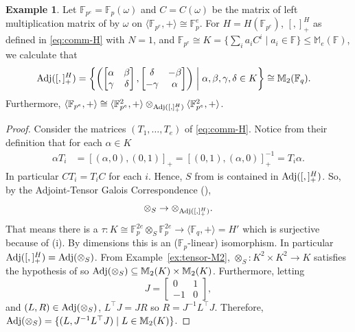 \documentclass{toc}
\numberwithin{equation}{section}
\theoremstyle{plain}       %
\theoremstyle{remark}
\theoremstyle{definition}
\newtheorem{ex}[equation]{Example}  %
\numberwithin{figure}{section}
\numberwithin{table}{section}
\renewcommand{\subset}{\subseteq}
\newcommand{\bbF}{\mathbb{F}}  %
\begin{document}
\begin{ex}\label{ex:Hei-Adj}
	Let $\bbF_{p^e}=\bbF_p(\omega)$ and $C=C(\omega)$ be the matrix of left
	multiplication matrix of by $\omega$ on $\langle \bbF_{p^e},+\rangle\cong
	\bbF_p^e$. For $H=H(\bbF_{p^e})$, $[,]_+^H$ as defined in \eqref{eq:comm-H}
	with $N=1$, and $\bbF_{p^e}\cong K=\{\sum_i a_i C^i\mid a_i\in\bbF\}\leq
	\mathbb{M}_e(\bbF)$, we calculate that
	\begin{align*}
	{\rm Adj}([,]_+^H) & = \left\{
	\left(\begin{bmatrix} \alpha &\beta \\\gamma & \delta \end{bmatrix},
	\begin{bmatrix} \delta & -\beta\\ -\gamma & \alpha \end{bmatrix}\right) 
		\;\middle|\; \alpha,\beta,\gamma,\delta\in K
	\right\}\cong \mathbb{M}_2(\bbF_q).
	\end{align*}
	Furthermore, $\langle \bbF_{p^e},+\rangle\cong \langle \bbF_{p^e}^2,
	+\rangle\otimes_{{\rm Adj}([,]_+^H)}\langle \bbF^2_{p^e},+\rangle$.
\end{ex}
\begin{proof}
Consider the matrices $(T_1,\ldots,T_e)$ of \eqref{eq:comm-H}.  Notice from
their definition that for each $\alpha\in K$
\begin{align}
	\alpha T_i & = [(\alpha,0),(0,1)]_+= [(0,1),(\alpha,0)]_+^{-1}
		= T_i\alpha.
\end{align}
In particular $CT_i=T_iC$ for each $i$.  Hence, $S$ from
 is contained in ${\rm Adj}([,]_+^H)$.  So, by the
Adjoint-Tensor Galois Correspondence (),
\[
\otimes_{S}\to
\otimes_{{\rm Adj}([,]_+^H)}.
\]
That means there is a
$\tau:K\cong \bbF_p^{2e}\otimes_S\bbF_p^{2e}\to \langle \bbF_q,
+\rangle=H'$ which is surjective because of
(i).  By dimensions this is an
($\bbF_p$-linear) isomorphism.  In particular
${\rm Adj}([,]_+^H)={\rm Adj}(\otimes_S)$.  {}From
Example~\ref{ex:tensor-M2}, $\otimes_S:K^2\times K^2\to K$ satisfies
the hypothesis of  so
${\rm Adj}(\otimes_S)\subset \mathbb{M}_2(K)\times \mathbb{M}_2(K)$.
Furthermore, letting
\[
J=\begin{bmatrix} 0 & 1 \\ -1 & 0 \end{bmatrix},
\]
 and
$(L,R)\in {\rm Adj}(\otimes_S)$, $L^{\top}J=JR$ so
$R=J^{-1}L^{\top}J$.  Therefore,
${\rm Adj}(\otimes_S)=\{(L,J^{-1}L^{\top}J)\mid L\in
\mathbb{M}_2(K)\}$.
\end{proof}
\end{document}
